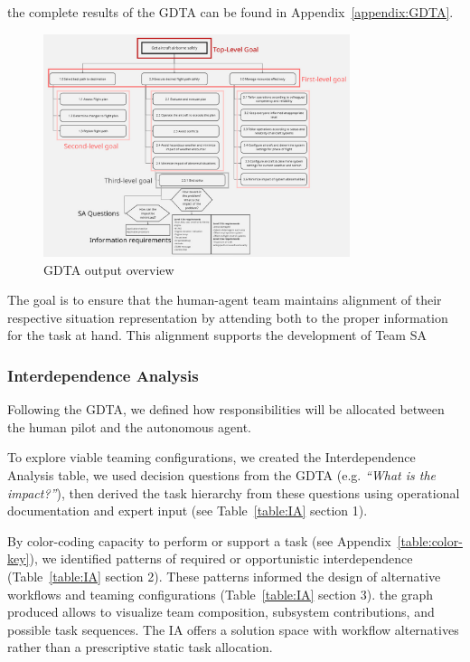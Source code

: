 \documentclass[12pt,a4paper]{article} %
\begin{document}
	the complete results of the GDTA can be found in Appendix~\ref{appendix:GDTA}.

	\begin{figure}[H]
		\centering
		\includegraphics[width=0.8\textwidth]{./images/gdta}
		\caption{GDTA output overview}
		\label{fig:gdta}
	\end{figure}

	The goal is to ensure that the human-agent team maintains alignment of their respective situation representation by attending both to the proper information for the task at hand. This alignment supports the development of Team SA
	
	\subsubsection{Interdependence Analysis}
	\label{sec:ia}
	Following the GDTA, we defined how responsibilities will be allocated between the human pilot and the autonomous agent.

	To explore viable teaming configurations, we created the Interdependence Analysis table, we used decision questions from the GDTA (e.g. \emph{“What is the impact?”}), then derived the task hierarchy from these questions using operational documentation and expert input (see Table~\ref{table:IA} section 1).
	
	By color-coding capacity to perform or support a task (see Appendix~\ref{table:color-key}), we identified patterns of required or opportunistic interdependence (Table~\ref{table:IA} section 2). These patterns informed the design of alternative workflows and teaming configurations (Table~\ref{table:IA} section 3). the graph produced allows to visualize team composition, subsystem contributions, and possible task sequences. The IA offers a solution space with workflow alternatives rather than a prescriptive static task allocation.
\end{document}
